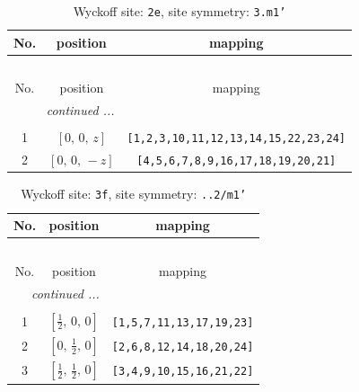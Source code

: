 \documentclass[fleqn,8pt]{jsarticle}
\begin{document}
\begin{longtable}{ccc}
\caption{Wyckoff site: {\tt 2e}, site symmetry: {\tt 3.m1'}}
 \\
 \hline \hline
No. & position & mapping \\ \hline \endfirsthead

\multicolumn{2}{l}{\tablename\ \thetable{}} \\
 \hline \hline
No. & position & mapping \\ \hline \endhead

 \hline \hline
\multicolumn{2}{r}{\footnotesize\it continued ...} \\ \endfoot

 \hline \hline
\multicolumn{2}{r}{} \\ \endlastfoot

1 & $\left[ 0,\, 0,\, z \right]$ & {\tt [1,2,3,10,11,12,13,14,15,22,23,24]} \\ \hline
2 & $\left[ 0,\, 0,\, - z \right]$ & {\tt [4,5,6,7,8,9,16,17,18,19,20,21]} \\
\end{longtable}
\renewcommand{\arraystretch}{1.2}
\begin{longtable}{ccc}
\caption{Wyckoff site: {\tt 3f}, site symmetry: {\tt ..2/m1'}}
 \\
 \hline \hline
No. & position & mapping \\ \hline \endfirsthead

\multicolumn{2}{l}{\tablename\ \thetable{}} \\
 \hline \hline
No. & position & mapping \\ \hline \endhead

 \hline \hline
\multicolumn{2}{r}{\footnotesize\it continued ...} \\ \endfoot

 \hline \hline
\multicolumn{2}{r}{} \\ \endlastfoot

1 & $\left[ \frac{1}{2},\, 0,\, 0 \right]$ & {\tt [1,5,7,11,13,17,19,23]} \\ \hline
2 & $\left[ 0,\, \frac{1}{2},\, 0 \right]$ & {\tt [2,6,8,12,14,18,20,24]} \\ \hline
3 & $\left[ \frac{1}{2},\, \frac{1}{2},\, 0 \right]$ & {\tt [3,4,9,10,15,16,21,22]} \\
\end{longtable}
\renewcommand{\arraystretch}{1.2}
\end{document}
